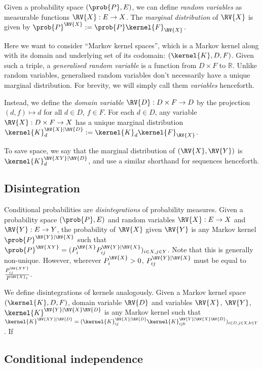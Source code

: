 Given a probability space $(\prob{P},E)$, we can define \emph{random variables} as measurable functions $\RV{X}:E\to X$. The \emph{marginal distribution} of $\RV{X}$ is given by $\prob{P}^{\RV{X}}:=\prob{P}\kernel{F}_{\RV{X}}$. 

Here we want to consider ``Markov kernel spaces'', which is a Markov kernel along with its domain and underlying set of its codomain: $(\kernel{K},D,F)$. Given such a triple, a \emph{generalised random variable} is a function from $D\times F$ to $\mathbb{R}$. Unlike random variables, generalised random variables don't necessarily have a unique marginal distribution. For brevity, we will simply call them \emph{variables} henceforth.

Instead, we define the \emph{domain variable} $\RV{D}:D\times F\to D$ by the projection $(d,f)\mapsto d$ for all $d\in D$, $f\in F$. For each $d\in D$, any variable $\RV{X}:D\times F\to X$ has a unique marginal distribution $\kernel{K}^{\RV{X}|\RV{D}}_d:=\kernel{K}_d\kernel{F}_{\RV{X}}$. 

To save space, we say that the marginal distribution of $(\RV{X},\RV{Y})$ is $\kernel{K}^{\RV{XY}|\RV{D}}_d$, and use a similar shorthand for sequences henceforth.

\subsection{Disintegration}

Conditional probabilities are \emph{disintegrations} of probability measures. Given a probability space $(\prob{P},E)$ and random variables $\RV{X}:E\to X$ and $\RV{Y}:E\to Y$, the probability of $\RV{X}$ given $\RV{Y}$ is any Markov kernel $\prob{P}^{\RV{Y}|\RV{X}}$ such that $\prob{P}^{\RV{XY}}= (P^{\RV{X}}_i P^{\RV{Y}|\RV{X}}_{ij})_{i\in X, j\in Y}$. Note that this is generally non-unique. However, wherever $P^{\RV{X}}_i>0$, $P^{\RV{Y}|\RV{X}}_{ij}$ must be equal to $\frac{P^{\RV{XY}}_{ij}}{P^{\RV{X}_i}}$.

We define disintegrations of kernels analogously. Given a Markov kernel space $(\kernel{K},D,F)$, domain variable $\RV{D}$ and variables $\RV{X}$, $\RV{Y}$, $\kernel{K}^{\RV{Y}|\RV{X}\RV{D}}$ is any Markov kernel such that $\kernel{K}^{\RV{XY}|\RV{D}} = (\kernel{K}^{\RV{X}|\RV{D}}_{ij} \kernel{K}^{\RV{Y}|\RV{X}\RV{D}}_{ijk})_{i\in D,j\in X,k\in Y}$. If 

\subsection{Conditional independence}

